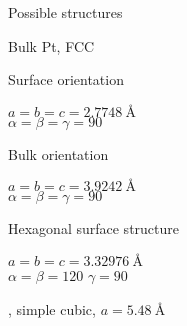 \begin{frame}{Possible structures}

Bulk Pt, FCC

Surface orientation

    $a=b=c=\SI{2.7748}{\angstrom}$\\
    $\alpha=\beta=\gamma=90$\degree

Bulk orientation

    $a=b=c = \SI{3.9242}{\angstrom}$\\
    $\alpha=\beta=\gamma=90$\degree

Hexagonal surface structure

    $a=b=c = \SI{3.32976}{\angstrom}$\\

    $\alpha=\beta=120$\degree
    $\gamma=90$\degree

\ptthreeofour, simple cubic, $a = \SI{5.48}{\angstrom}$
    
\end{frame}